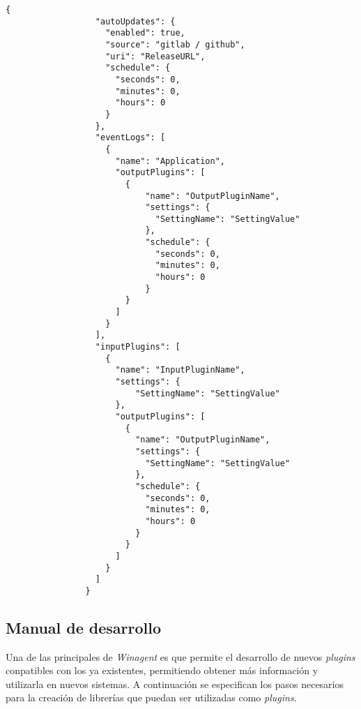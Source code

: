             \begin{lstlisting}[style=csharp, caption=Fichero de configuración]
                {
                  "autoUpdates": {
                    "enabled": true,
                    "source": "gitlab / github",
                    "uri": "ReleaseURL",
                    "schedule": {
                      "seconds": 0,
                      "minutes": 0,
                      "hours": 0
                    }
                  },
                  "eventLogs": [
                    {
                      "name": "Application",
                      "outputPlugins": [
                        {
                            "name": "OutputPluginName",
                            "settings": {
                              "SettingName": "SettingValue"
                            },
                            "schedule": {
                              "seconds": 0,
                              "minutes": 0,
                              "hours": 0
                            }
                        }
                      ]
                    }
                  ],
                  "inputPlugins": [
                    {
                      "name": "InputPluginName",
                      "settings": {
                          "SettingName": "SettingValue"
                      },
                      "outputPlugins": [
                        {
                          "name": "OutputPluginName",
                          "settings": {
                            "SettingName": "SettingValue"
                          },
                          "schedule": {
                            "seconds": 0,
                            "minutes": 0,
                            "hours": 0
                          }
                        }
                      ]
                    }
                  ]
                }
            \end{lstlisting}
            
            
        
    \subsection{Manual de desarrollo}
        Una de las  principales de \textit{Winagent} es que permite el desarrollo de nuevos \textit{plugins} conpatibles con los ya existentes, permitiendo obtener más información y utilizarla en nuevos sistemas. A continuación se especifican los pasos necesarios para la creación de librerías que puedan ser utilizadas como \textit{plugins}.
        
